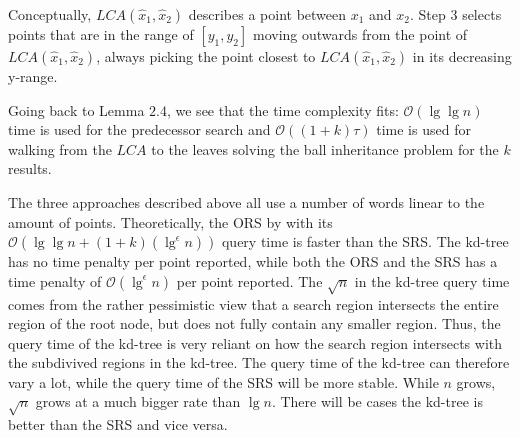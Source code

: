 Conceptually, $LCA(\hat{x}_1, \hat{x}_2)$ describes a point between $x_1$ and $x_2$. Step $3$ selects points that are in the range of $[y_1, y_2]$ moving outwards from the point of $LCA(\hat{x}_1, \hat{x}_2)$, always picking the point closest to $LCA(\hat{x}_1, \hat{x}_2)$ in its decreasing y-range. 

Going back to Lemma $2.4$, we see that the time complexity fits: $\mathcal{O}(\lg \lg n)$ time is used for the predecessor search and $\mathcal{O}((1+k)\tau)$ time is used for walking from the $LCA$ to the leaves solving the ball inheritance problem for the $k$ results.

The three approaches described above all use a number of words linear to the amount of points. Theoretically, the ORS by \citet{chanetal} with its $\mathcal{O}(\lg \lg n + (1+k)(\lg^\epsilon n))$ query time is faster than the SRS. The kd-tree has no time penalty per point reported, while both the ORS and the SRS has a time penalty of $\mathcal{O}(\lg^\epsilon n)$ per point reported. The $\sqrt{n}$ in the kd-tree query time comes from the rather pessimistic view that a search region intersects the entire region of the root node, but does not fully contain any smaller region. Thus, the query time of the kd-tree is very reliant on how the search region intersects with the subdivived regions in the kd-tree. The query time of the kd-tree can therefore vary a lot, while the query time of the SRS will be more stable. While $n$ grows, $\sqrt{n}$ grows at a much bigger rate than $\lg n$. There will be cases the kd-tree is better than the SRS and vice versa. 




